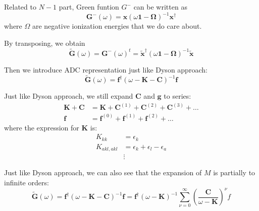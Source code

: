 Related to $N-1$ part, Green funtion $G^{-}$ can be written as
\begin{equation}
	\boldsymbol{G}^{-}(\omega)=\boldsymbol{x}(\omega \mathbf{1}-\boldsymbol{\Omega})^{-1} \boldsymbol{x}^{\dagger}
\end{equation}
where $\Omega$ are negative ionization energies that we do care about.

By transposing, we obtain
\begin{equation}
	\tilde{\boldsymbol{G}}(\omega)=\boldsymbol{G}^{-}(\omega)^{t}=\tilde{\boldsymbol{x}}^{\dagger}(\omega \mathbf{1}-\boldsymbol{\Omega})^{-1} \tilde{\boldsymbol{x}}
\end{equation}

Then we introduce ADC representation just like Dyson approach:
\begin{equation}
	\tilde{\boldsymbol{G}}(\omega)=\boldsymbol{f}^{\dagger}(\omega-\boldsymbol{K}-\boldsymbol{C})^{-1} \boldsymbol{f}
\end{equation}

Just like Dyson approach, we still expand $\boldsymbol{C}$ and $\boldsymbol{g}$ to series:
\begin{equation}
	\begin{aligned} \boldsymbol{K}+\boldsymbol{C} &=\boldsymbol{K}+\boldsymbol{C}^{(1)}+\boldsymbol{C}^{(2)}+\boldsymbol{C}^{(3)}+\ldots \\ \boldsymbol{f} &=\boldsymbol{f}^{(0)}+\boldsymbol{f}^{(1)}+\boldsymbol{f}^{(2)}+\ldots \end{aligned}
\end{equation}
where the expression for $\boldsymbol{K}$ is:
\begin{equation}
	\begin{aligned} K_{k k} &=\epsilon_{k} \\ K_{a k l, a k l} &=\epsilon_{k}+\epsilon_{l}-\epsilon_{a} \\ & \vdots \end{aligned}
\end{equation}

Just like Dyson approach, we can also see that the expansion of $M$ is partially to infinite orders:
\begin{equation}
	\tilde{\boldsymbol{G}}(\omega)=\boldsymbol{f}^{\dagger}(\omega-\boldsymbol{K}-\boldsymbol{C})^{-1} \boldsymbol{f}=\boldsymbol{f}^{\dagger}(\omega-\boldsymbol{K})^{-1} \sum_{\nu=0}^{\infty}\left(\frac{\boldsymbol{C}}{\omega-\boldsymbol{K}}\right)^{\nu} f
\end{equation}

